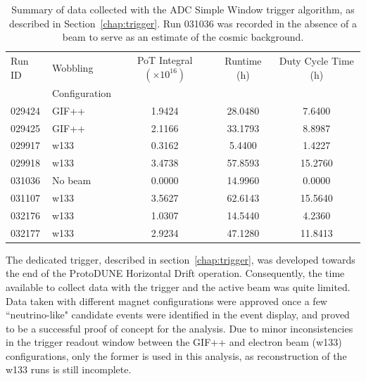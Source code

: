\begin{table}[htbp]
\centering
\begin{tabularx}{\textwidth}{@{} l l c c c @{}}
\toprule
Run ID & Wobbling & PoT Integral $(\times 10^{16})$ & Runtime (h) & Duty Cycle Time (h) \\
       & Configuration &  &  &    \\
\midrule
029424 & GIF++   & 1.9424 & 28.0480 & 7.6400  \\
029425 & GIF++   & 2.1166 & 33.1793 & 8.8987  \\
029917 & w133    & 0.3162 & 5.4400  & 1.4227  \\
029918 & w133    & 3.4738 & 57.8593 & 15.2760 \\
031036 & No beam & 0.0000 & 14.9960 & 0.0000  \\
031107 & w133    & 3.5627 & 62.6143 & 15.5640 \\
032176 & w133    & 1.0307 & 14.5440 & 4.2360  \\
032177 & w133    & 2.9234 & 47.1280 & 11.8413 \\
\bottomrule
\end{tabularx}
\caption{Summary of data collected with the ADC Simple Window trigger algorithm, as described in Section~\ref{chap:trigger}. Run 031036 was recorded in the absence of a beam to serve as an estimate of the cosmic background.}
\label{tab:data_table}
\end{table}

The dedicated trigger, described in section~\ref{chap:trigger}, was developed towards the end of the ProtoDUNE Horizontal Drift operation. Consequently, the time available to collect data with the trigger and the active beam was quite limited. Data taken with different magnet configurations were approved once a few ``neutrino-like" candidate events were identified in the event display, and proved to be a successful proof of concept for the analysis. Due to minor inconsistencies in the trigger readout window between the GIF++ and electron beam (w133) configurations, only the former is used in this analysis, as reconstruction of the w133 runs is still incomplete.  %

